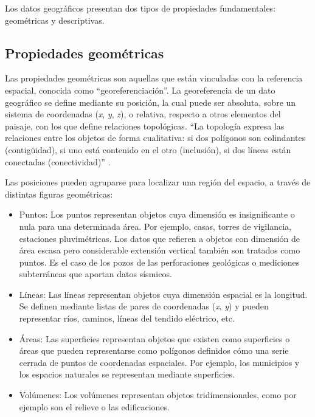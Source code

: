Los datos geográficos presentan dos tipos de propiedades fundamentales: geométricas y descriptivas.

\subsection{Propiedades geométricas}

Las propiedades geométricas son aquellas que están vinculadas con la referencia espacial, conocida como “georeferenciación”.
La georeferencia de un dato geográfico se define mediante su posición, la cual puede ser absoluta, sobre un sistema de coordenadas (\textit{x}, \textit{y}, \textit{z}), 
o relativa, respecto a otros elementos del paisaje, con los que define relaciones topológicas. 
“La topología expresa las relaciones entre los objetos de forma cualitativa: si dos polígonos son colindantes (contigüidad), si uno
está contenido en el otro (inclusión), si dos líneas están conectadas (conectividad)” \cite{Puebla-Gould}.

Las posiciones pueden agruparse para localizar una región del espacio, a través de distintas figuras geométricas:
\begin{itemize}
  \item Puntos: Los puntos representan objetos cuya dimensión es insignificante o nula para una determinada área. 
  Por ejemplo, casas, torres de vigilancia, estaciones pluvimétricas. Los datos que refieren a objetos con dimensión de área escasa
  pero considerable extensión vertical también son tratados como puntos. Es el caso de los pozos de las perforaciones geológicas
  o mediciones subterráneas que aportan datos sísmicos.
  \item Líneas: Las líneas representan objetos cuya dimensión espacial es la longitud. Se definen mediante listas de pares de coordenadas (\textit{x}, \textit{y}) y pueden representar
  ríos, caminos, líneas del tendido eléctrico, etc.
  \item Áreas: Las superficies representan objetos que existen como superficies o áreas que pueden representarse como polígonos definidos cómo una serie
  cerrada de puntos de coordenadas espaciales. Por ejemplo, los municipios y los espacios naturales se representan mediante superficies.
  \item Volúmenes: Los volúmenes representan objetos tridimensionales, como por ejemplo son el relieve o las edificaciones.
\end{itemize}

